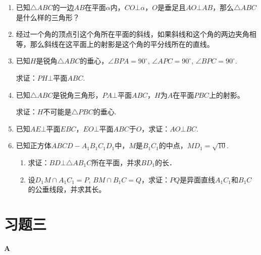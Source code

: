 \begin{enumerate}
\item 已知$\triangle ABC$的一边$AB$在平面$\alpha$内，$CO\bot \alpha$，$O$是垂足且$AO\bot AB$，那么$\triangle ABC$是什么样的三角形？
\item 经过一个角的顶点引这个角所在平面的斜线，如果斜线和这个角的两边夹角相等，那么斜线在这平面上的射影是这个角的平分线所在的直线。
\item 已知$H$是锐角$\triangle ABC$的垂心，$\angle BPA=90^{\circ}$, $\angle APC=90^{\circ}$, $\angle BPC=90^{\circ}$.

求证：$PH\bot $平面$ABC$.
\item 已知$\triangle ABC$是锐角三角形，$PA\bot $平面$ABC$，$H$为$A$在平面$PBC$上的射影。

求证：$H$不可能是$\triangle PBC$的垂心.

\item 已知$AE\bot $平面$EBC$，$EO\bot $平面$ABC$于$O$，求证：$AO\bot BC$.
\item 已知正方体$ABCD-A_1B_1C_1D_1$中，$M$是$B_1C_1$的中点，$MD_1=\sqrt{10}$.
\begin{enumerate}[(1)]
\item 求证：$BD\bot\triangle AB_1C$所在平面，并求$BD_1$的长．
\item 设$D_1M\cap A_1C_1=P$, $BM\cap B_1C=Q$，求证：$PQ$是异面直线$A_1C_1$和$B_1C$的公垂线段，并求其长。
\end{enumerate}
\end{enumerate}


\section*{习题三}
\begin{center}
    \bfseries A
\end{center}

